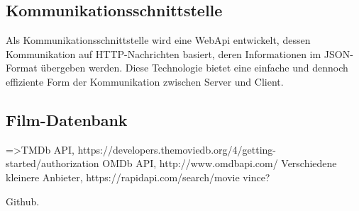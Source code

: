 \subsection{Kommunikationsschnittstelle}
Als Kommunikationsschnittstelle wird eine WebApi entwickelt, dessen Kommunikation auf HTTP-Nachrichten basiert, deren Informationen im JSON-Format übergeben werden. Diese Technologie bietet eine einfache und dennoch effiziente Form der Kommunikation zwischen Server und Client.

\subsection{Film-Datenbank}
=>TMDb API, https://developers.themoviedb.org/4/getting-started/authorization\newline
OMDb API, http://www.omdbapi.com/\newline
Verschiedene kleinere Anbieter, https://rapidapi.com/search/movie\newline
    vince?
\newline

Github.